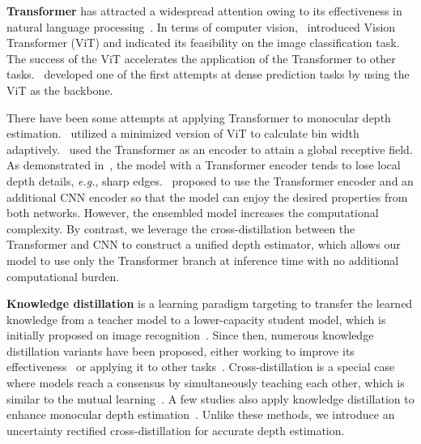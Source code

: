 \documentclass[letterpaper]{article} \usepackage{aaai23}  \usepackage{times}  \usepackage{helvet}  \usepackage{courier}  \usepackage[hyphens]{url}  \usepackage{graphicx} \urlstyle{rm} \def\UrlFont{\rm}  \usepackage{natbib}  \usepackage{caption} \frenchspacing  \setlength{\pdfpagewidth}{8.5in} \setlength{\pdfpageheight}{11in} \usepackage{algorithm}
\begin{document}
\textbf{Transformer} has attracted a widespread attention owing to its effectiveness in natural language processing~\cite{vaswani2017attention}. In terms of computer vision,~\citet{dosovitskiy2020image} introduced Vision Transformer (ViT) and indicated its feasibility on the image classification task. The success of the ViT accelerates the application of the Transformer to other tasks.~\citet{zheng2021rethinking} developed one of the first attempts at dense prediction tasks by using the ViT as the backbone.

There have been some attempts at applying Transformer to monocular depth estimation.~\citet{bhat2021adabins} utilized a minimized version of ViT to calculate bin width adaptively.~\citet{yang2021transformer,ranftl2021vision,kim2022global,Yuan_2022_CVPR} used the Transformer as an encoder to attain a global receptive field. As demonstrated in~\cite{li2022depthformer}, the model with a Transformer encoder tends to lose local depth details, \textit{e.g.}, sharp edges.~\citet{li2022depthformer} proposed to use the Transformer encoder and an additional CNN encoder so that the model can enjoy the desired properties from both networks. However, the ensembled model increases the computational complexity. By contrast, we leverage the cross-distillation between the Transformer and CNN to construct a unified depth estimator, which allows our model to use only the Transformer branch at inference time with no additional computational burden.

\textbf{Knowledge distillation} is a learning paradigm targeting to transfer the learned knowledge from a teacher model to a lower-capacity student model, which is initially proposed on image recognition~\cite{hinton2015distilling}. Since then, numerous  knowledge distillation variants have been proposed, either working to improve its effectiveness~\cite{yim2017gift,tian2019contrastive,sun2019deeply} or applying it to other tasks~\cite{garcia2018modality,hafner2018cross}. Cross-distillation is a special case where models reach a consensus by simultaneously teaching each other, which is similar to the mutual learning~\cite{zhang2018deep}. A few studies also apply knowledge distillation to enhance monocular depth estimation~\cite{pilzer2019refine,aleotti2020real}. Unlike these methods, we introduce an uncertainty rectified cross-distillation for accurate depth estimation. 
\end{document}
